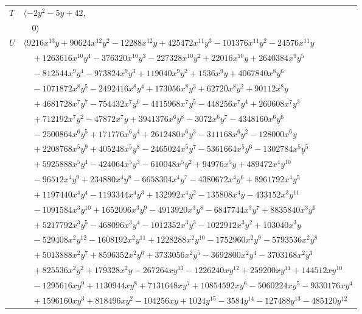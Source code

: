 \documentclass[11pt]{article}
\begin{document}
\begin{longtable}{@{}ll@{}}
$T$ & $\langle -2y^{2}-5y+42,$\\
 & $\quad 0\rangle$\\
$U$ & $\langle 9216x^{13}y+90624x^{12}y^{2}-12288x^{12}y+425472x^{11}y^{3}-101376x^{11}y^{2}-24576x^{11}y$\\
 & $\quad +1263616x^{10}y^{4}-376320x^{10}y^{3}-227328x^{10}y^{2}+22016x^{10}y+2640384x^{9}y^{5}$\\
 & $\quad -812544x^{9}y^{4}-973824x^{9}y^{3}+119040x^{9}y^{2}+1536x^{9}y+4067840x^{8}y^{6}$\\
 & $\quad -1071872x^{8}y^{5}-2492416x^{8}y^{4}+173056x^{8}y^{3}+62720x^{8}y^{2}+90112x^{8}y$\\
 & $\quad +4681728x^{7}y^{7}-754432x^{7}y^{6}-4115968x^{7}y^{5}-448256x^{7}y^{4}+260608x^{7}y^{3}$\\
 & $\quad +712192x^{7}y^{2}-47872x^{7}y+3941376x^{6}y^{8}-3072x^{6}y^{7}-4348160x^{6}y^{6}$\\
 & $\quad -2500864x^{6}y^{5}+171776x^{6}y^{4}+2612480x^{6}y^{3}-311168x^{6}y^{2}-128000x^{6}y$\\
 & $\quad +2208768x^{5}y^{9}+405248x^{5}y^{8}-2465024x^{5}y^{7}-5361664x^{5}y^{6}-1302784x^{5}y^{5}$\\
 & $\quad +5925888x^{5}y^{4}-424064x^{5}y^{3}-610048x^{5}y^{2}+94976x^{5}y+489472x^{4}y^{10}$\\
 & $\quad -96512x^{4}y^{9}+234880x^{4}y^{8}-6658304x^{4}y^{7}-4380672x^{4}y^{6}+8961792x^{4}y^{5}$\\
 & $\quad +1197440x^{4}y^{4}-1193344x^{4}y^{3}+132992x^{4}y^{2}-135808x^{4}y-433152x^{3}y^{11}$\\
 & $\quad -1091584x^{3}y^{10}+1652096x^{3}y^{9}-4913920x^{3}y^{8}-6847744x^{3}y^{7}+8835840x^{3}y^{6}$\\
 & $\quad +5217792x^{3}y^{5}-468096x^{3}y^{4}-1012352x^{3}y^{3}-1022912x^{3}y^{2}+103040x^{3}y$\\
 & $\quad -529408x^{2}y^{12}-1608192x^{2}y^{11}+1228288x^{2}y^{10}-1752960x^{2}y^{9}-5793536x^{2}y^{8}$\\
 & $\quad +5013888x^{2}y^{7}+8596352x^{2}y^{6}+3733056x^{2}y^{5}-3692800x^{2}y^{4}-3703168x^{2}y^{3}$\\
 & $\quad +825536x^{2}y^{2}+179328x^{2}y-267264xy^{13}-1226240xy^{12}+259200xy^{11}+144512xy^{10}$\\
 & $\quad -1295616xy^{9}+1130944xy^{8}+7131648xy^{7}+10854592xy^{6}-5060224xy^{5}-9330176xy^{4}$\\
 & $\quad +1596160xy^{3}+818496xy^{2}-104256xy+1024y^{15}-3584y^{14}-127488y^{13}-485120y^{12}$\\

\end{longtable}
\end{document}
